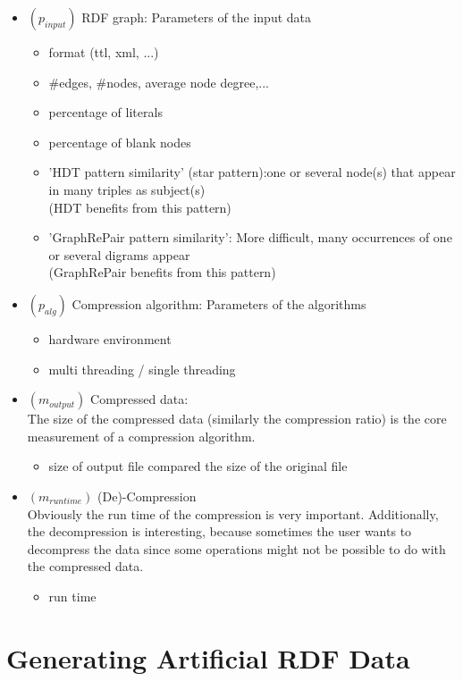 \documentclass[a4paper]{scrartcl}
\begin{document}
\begin{itemize}
	\item $ (p_{input}) $ RDF graph: Parameters of the input data
		\begin{itemize}
			\item format (ttl, xml, ...)
			\item \#edges, \#nodes, average node degree,...
			\item percentage of literals
			\item percentage of blank nodes
			\item 'HDT pattern similarity' (star pattern):one or several node(s) that appear in many triples as subject(s)\\
						(HDT benefits from this pattern)
			\item 'GraphRePair pattern similarity': More difficult, many occurrences of one or several digrams appear\\
			(GraphRePair benefits from this pattern)
		\end{itemize}
	\item \textbf{$ (p_{alg}) $} Compression algorithm: Parameters of the algorithms
	\begin{itemize}
		\item hardware environment
		\item multi threading / single threading
	\end{itemize}
	\item \textbf{$ (m_{output}) $} Compressed data:\\
	The size of the compressed data (similarly the compression ratio) is the core measurement of a compression algorithm.
	\begin{itemize}
		\item size of output file compared the size of the original file
	\end{itemize}
	\item \textbf{$ (m_{runtime}) $} (De)-Compression\\
	Obviously the run time of the compression is very important. Additionally, the decompression is interesting, because sometimes the user wants to decompress the data since some operations might not be possible to do with the compressed data.
	\begin{itemize}
		\item run time
	\end{itemize}
\end{itemize}

\section*{Generating Artificial RDF Data}
\end{document}
